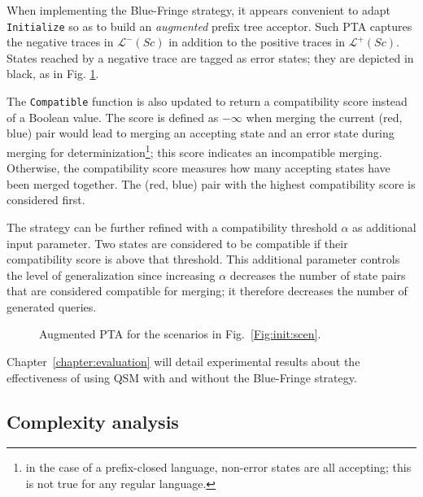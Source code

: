 When implementing the Blue-Fringe strategy, it appears convenient to adapt \texttt{Initialize} so as to build an \emph{augmented} prefix tree acceptor. Such PTA captures the negative traces in $\mathcal{L}^-(Sc)$ in addition to the positive traces in $\mathcal{L}^+(Sc)$. States reached by a negative trace are tagged as error states; they are depicted in black, as in Fig. \ref{figure:augmented-pta}. 

The \texttt{Compatible} function is also updated to return a compatibility score instead of a Boolean value. The score is defined as $-\infty$ when merging the current (red, blue) pair would lead to merging an accepting state and an error state during merging for determinization\footnote{in the case of a prefix-closed language, non-error states are all accepting; this is not true for any regular language.}; this score indicates an incompatible merging. Otherwise, the compatibility score measures how many accepting states have been merged together. The (red, blue) pair with the highest compatibility score is considered first. 

The strategy can be further refined with a compatibility threshold $\alpha$ as additional input parameter. Two states are considered to be compatible if their compatibility score is above that threshold. This additional parameter controls the level of generalization since increasing $\alpha$ decreases the number of state pairs that are considered compatible for merging; it therefore decreases the number of generated queries.

\begin{figure}\centering
{}
\caption{Augmented PTA for the scenarios in Fig.~\ref{Fig:init:scen}\label{figure:augmented-pta}.}
\end{figure}

Chapter~\ref{chapter:evaluation} will detail experimental results about the effectiveness of using QSM with and without the Blue-Fringe strategy.

\subsection{Complexity analysis}

